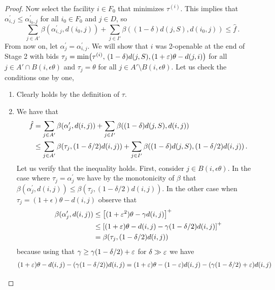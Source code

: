 \begin{proof}
Now select the facility $i \in F_0$ that minimizes $\tau^{(i)}$. This implies that $\alpha^\prime_{i,j} \leq \alpha^\prime_{i_0,j}$ for all $i_0 \in F_0$ and $j \in D$, so
\begin{equation}
    \label{eq:minimal-facility}
    \sum_{j \in A'} \beta(\alpha^\prime_{i,j}, d(i_0,j)) + \sum_{j \in I'} \beta((1-\delta)d(j, S), d(i_0,j)) \le \hat f\,.
\end{equation}
From now on, let $\alpha_j^\prime = \alpha_{i,j}^\prime$.
We will show that $i$ was 2-openable at the end of Stage 2 with bids $\tau_j = \min\bigl(\tau^{(i)},\,(1-\delta)d(j,S), (1+\varepsilon) \theta - d(j,i)\bigr)$ for all $j \in A' \cap B(i,\epsilon \theta)$ and $\tau_j = \theta$ for all $j \in A'\setminus B(i,\epsilon \theta)$.
Let us check the conditions one by one,
\begin{enumerate}
        \item[\textbf{(i)} - \textbf{(ii)}] Clearly holds by the definition of $\tau$.
        \item[\textbf{(iii)}]
        We have that 
        \begin{align*}
            \hat f & = \sum_{j \in A'} \beta(\alpha_j^\prime, d(i,j)) + \sum_{j \in I'} \beta((1-\delta)d(j, S), d(i,j)) \\ 
            & \le \sum_{j \in A'} \beta(\tau_j, (1- \delta/2)d(i,j)) + \sum_{j \in I'} \beta((1-\delta)d(j, S), (1- \delta/2)d(i,j))\,.
        \end{align*}
        Let us verify that the inequality holds. First, consider $j \in B(i,\epsilon \theta)$. In the case where $\tau_j = \alpha^\prime_j$ we have by the monotonicity of $\beta$ that $\beta(\alpha_j^\prime, d(i,j)) \le \beta(\tau_j,  (1-\delta/2) d(i,j))$. In the other case when $\tau_j = (1+\epsilon) \theta - d(i,j)$ observe that
        \begin{align*}
            \beta(\alpha_j^\prime, d(i,j)) & \le \left[(1+\varepsilon^2)\theta - \gamma  d(i,j)\right]^+ \\ & \le \left[(1+\varepsilon)\theta - d(i,j) - \gamma (1-\delta/2) d(i,j)\right]^+ 
            \\ & = \beta(\tau_j,  (1-\delta/2) d(i,j))
        \end{align*}
        because using that $\gamma \geq \gamma (1-\delta/2) + \varepsilon$ for $\delta \gg \varepsilon$ we have
    \begin{align*}
        (1+\epsilon) \theta - d(i, j)-(\gamma (1-\delta/2)) d(i, j)
        &= (1+\epsilon) \theta - (1-\eps)d(i, j)-(\gamma (1-\delta/2) + \eps) d(i, j)\\

\end{align*}
\end{enumerate}
\end{proof}
